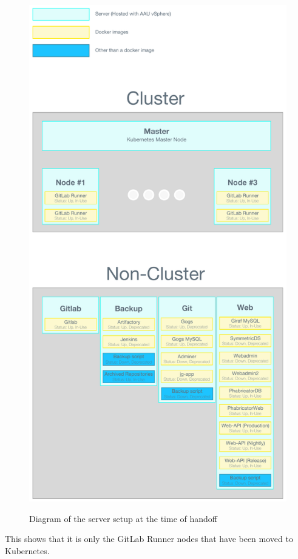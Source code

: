 \begin{figure}[h]
    \centering
    \caption{Diagram of the server setup at the time of handoff\cite[p.~74]{SW611F18}}
    \includegraphics[height=1\textheight]{figures/Server-Overview.pdf}
    \label{fig:state-at-handoff:server}
\end{figure}

This shows that it is only the GitLab Runner nodes that have been moved to Kubernetes. 




